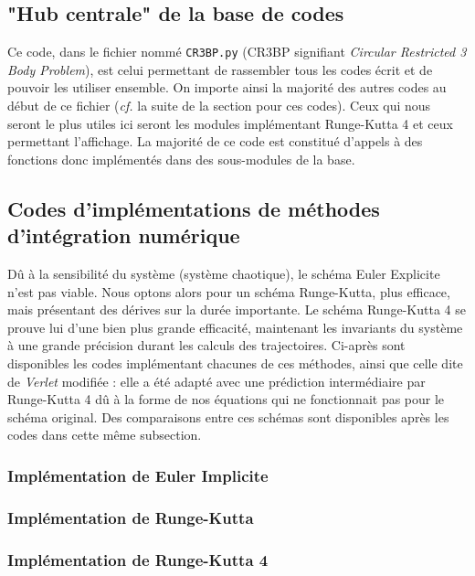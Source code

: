 \documentclass[12pt]{article}
\theoremstyle{definition}
\theoremstyle{definition}
\begin{document}
	
	\subsection{"Hub centrale" de la base de codes}
	Ce code, dans le fichier nommé \verb|CR3BP.py| (CR3BP signifiant \textit{Circular Restricted 3 Body Problem}), est celui permettant de rassembler tous les codes écrit et de pouvoir les utiliser ensemble. On importe ainsi la majorité des autres codes au début de ce fichier (\textit{cf.} la suite de la section pour ces codes). Ceux qui nous seront le plus utiles ici seront les modules implémentant Runge-Kutta 4 et ceux permettant l'affichage. La majorité de ce code est constitué d'appels à des fonctions donc implémentés dans des sous-modules de la base.
	
	
	\clearpage
	\subsection{Codes d'implémentations de méthodes d'intégration numérique}
	Dû à la sensibilité du système (système chaotique), le schéma Euler Explicite n'est pas viable. Nous optons alors pour un schéma Runge-Kutta, plus efficace, mais présentant des dérives sur la durée importante. Le schéma Runge-Kutta 4 se prouve lui d'une bien plus grande efficacité, maintenant les invariants du système à une grande précision durant les calculs des trajectoires. Ci-après sont disponibles les codes implémentant chacunes de ces méthodes, ainsi que celle dite de \textit{Verlet} modifiée : elle a été adapté avec une prédiction intermédiaire par Runge-Kutta 4 dû à la forme de nos équations qui ne fonctionnait pas pour le schéma original. Des comparaisons entre ces schémas sont disponibles après les codes dans cette même subsection.
	\subsubsection{Implémentation de Euler Implicite}
	
	
	\subsubsection{Implémentation de Runge-Kutta}
	
	
	\subsubsection{Implémentation de Runge-Kutta 4}
	
	
\end{document}
